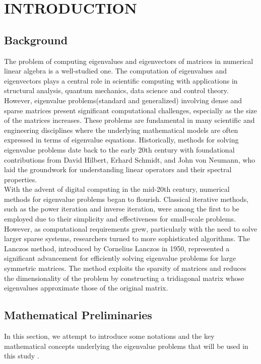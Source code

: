 \chapter{INTRODUCTION}
\newtheorem{theorem}{Theorem}[section]
\newtheorem{definition}{Definition}[section]
\section{Background}
The problem of computing eigenvalues and eigenvectors of matrices in numerical linear algebra is a well-studied one. The computation of eigenvalues and eigenvectors plays a central role in scientific computing with applications in structural analysis, quantum mechanics, data science and control theory. However, eigenvalue problems(standard and generalized)  involving dense and sparse matrices present significant computational challenges, especially as the size of the matrices increases. These problems are fundamental in many scientific and engineering disciplines where the underlying mathematical models are often expressed in terms of eigenvalue equations. Historically, methods for solving eigenvalue problems date back to the early 20th century with foundational contributions from David Hilbert, Erhard Schmidt, and John von Neumann, who laid the groundwork for understanding linear operators and their spectral properties.\\
With the advent of digital computing in the mid-20th century, numerical methods for eigenvalue problems began to flourish. Classical iterative methods, such as the power iteration and inverse iteration, were among the first to be employed due to their simplicity and effectiveness for small-scale problems. However, as computational requirements grew, particularly with the need to solve larger sparse systems, researchers turned to more sophisticated algorithms. The Lanczos method, introduced by Cornelius Lanczos in 1950, represented a significant advancement for efficiently solving eigenvalue problems for large symmetric matrices. The method exploits the sparsity of matrices and reduces the dimensionality of the problem by constructing a tridiagonal matrix whose eigenvalues approximate those of the original matrix.

\section{Mathematical Preliminaries}
In this section, we attempt to introduce some notations and the key mathematical concepts underlying the eigenvalue problems that will be used in this study .

